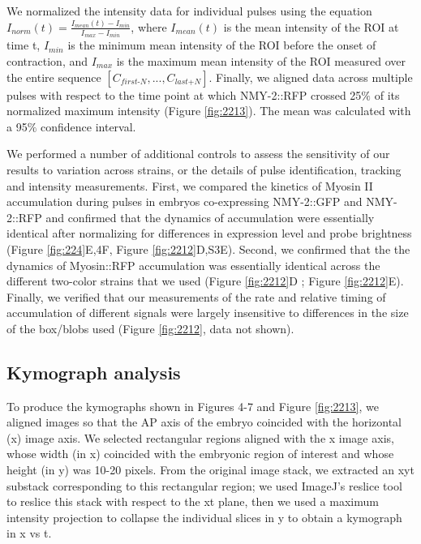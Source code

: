 We normalized the intensity data for individual pulses using the equation $I_{\textit{norm}}(t) = \frac{ I_{\textit{mean}}(t) - I_{\textit{min}} } {I_{\textit{max}} - I_{\textit{min}} }$, where $I_{\textit{mean}}(t)$ is the mean intensity of the ROI at time t, $I_{\textit{min}}$ is the minimum mean intensity of the ROI before the onset of contraction, and $I_{\textit{max}}$ is the maximum mean intensity of the ROI measured over the entire sequence $[C_{\textit{first-N}},...,C_{\textit{last+N}}]$.  Finally, we aligned data across multiple pulses with respect to the time point at which NMY-2::RFP crossed 25$\%$ of its normalized maximum intensity (Figure \ref{fig:2213}). The mean was calculated with a 95$\%$ confidence interval.


We performed a number of additional controls to assess the sensitivity of our results to variation across strains, or the details of pulse identification, tracking and intensity measurements.  First, we compared the kinetics of Myosin II accumulation during pulses in embryos co-expressing NMY-2::GFP and NMY-2::RFP and confirmed that the dynamics of accumulation were essentially identical after normalizing for differences in expression level and probe brightness (Figure \ref{fig:224}E,4F, Figure \ref{fig:2212}D,S3E). Second, we confirmed that the the dynamics of Myosin::RFP accumulation was essentially identical across the different two-color strains that we used (Figure \ref{fig:2212}D ; Figure \ref{fig:2212}E). Finally, we verified that our measurements of the rate and relative timing of accumulation of different signals were  largely insensitive to differences in  the size of the box/blobs used (Figure \ref{fig:2212}, data not shown).





\subsection{Kymograph analysis}
To produce the kymographs shown in Figures 4-7 and Figure \ref{fig:2213}, we aligned images so that the AP axis of the embryo coincided with the horizontal (x) image axis.  We selected rectangular regions aligned with the x image axis, whose width (in x) coincided with the embryonic region of interest and whose height (in y) was 10-20 pixels. From the original image stack, we extracted an xyt substack corresponding to this rectangular region; we used ImageJ’s reslice tool to reslice this stack with respect to the xt plane, then we used a maximum intensity projection to collapse the individual slices in y to obtain a kymograph  in x vs t.






